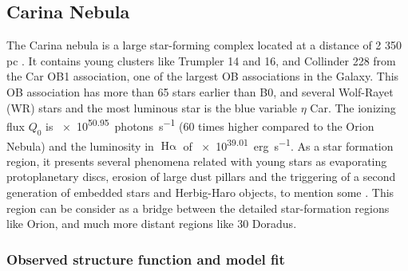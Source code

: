 \documentclass[fleqn,usenatbib, useAMS, a4paper]{mnras}
\newcommand\ha{\ensuremath{\text{H}\upalpha}}
\begin{document}
\subsection{Carina Nebula}
\label{sec:carina-nebula}

The Carina nebula is a large star-forming complex located at a distance of 2 350 pc \citetext{\SI{1}{\arcsecond} = \SI{0.01}{pc} ; \citealp{2006ApJ...644.1151S}}.
It contains young clusters like Trumpler 14 and 16, and Collinder 228 from the Car OB1 association, one of the largest OB associations in the Galaxy.
This OB association has more than 65 stars earlier than B0, and several Wolf-Rayet (WR) stars and the most luminous star is the blue variable $\eta$ Car.
The ionizing flux \(Q_0\) is \SI{e50.95}{photons.s^{-1}} \citep{2008hsf2.book..138S} (60 times higher compared to the Orion Nebula) and the luminosity in \ha{} of \SI{e39.01}{erg.s^{-1}}.
As a star formation region, it presents several phenomena related with young stars as evaporating protoplanetary discs, erosion of large dust pillars and the triggering of a second generation of embedded stars and Herbig-Haro objects, to mention some \citetext{see \citealp{2008hsf2.book..138S} and reference therein}. 
This region can be consider as a bridge between the detailed star-formation regions like Orion, and much more distant regions like 30 Doradus.

\subsubsection{Observed structure function and model fit}
\label{sec:observ-struct-funct-carina}
\end{document}
